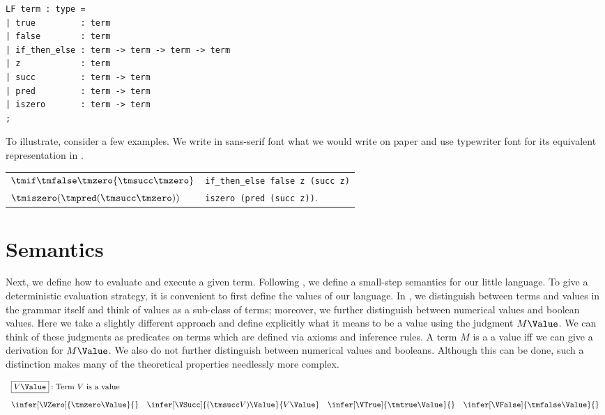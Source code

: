 \begin{lstlisting}
LF term : type =
| true         : term
| false        : term
| if_then_else : term -> term -> term -> term
| z            : term
| succ         : term -> term
| pred         : term -> term
| iszero       : term -> term
;
\end{lstlisting}

To illustrate, consider a few examples. We write in sans-serif font what
we would write on paper and use typewriter font for its equivalent
representation in \beluga.

\begin{center}
\begin{tabular}{l@{\quad is represented as \quad}l}
$\tmif \tmfalse \tmzero {\tmsucc \tmzero}$ &
\lstinline!if_then_else false z (succ z)!\\
$\tmiszero (\tmpred (\tmsucc \tmzero))$ & \lstinline!iszero (pred (succ z))!.
\end{tabular}
\end{center}


\section{Semantics}
Next, we define how to evaluate and execute a given term. Following
\cite{TAPL}, we define  a small-step semantics  for our  little language. To give  a  deterministic evaluation
strategy,  it is convenient to first define the values of our language.  In
\cite{TAPL}, we distinguish between terms and values in the grammar itself and
think of values  as a sub-class of terms; moreover, we further
distinguish between numerical values and boolean values. Here we take  a slightly different
approach and define explicitly  what it means  to be a value using the judgment
$M \Value$.  We can think of these judgments  as predicates on
terms which are defined  via  axioms and inference rules.  A term $M$ is a
a value iff we can give a derivation for $M \Value$. We also do not further
distinguish between numerical values and  booleans. Although this can
be done, such a distinction makes many of the theoretical properties
needlessly more complex.

\[
\begin{array}{c}
\multicolumn{1}{l}{\fbox{$V \Value$}: \mbox{Term $V$ is a value}}\\[1em]
\infer[\VZero]{\tmzero \Value}{} \quad
\infer[\VSucc]{(\tmsucc V) \Value}{V \Value} \quad
\infer[\VTrue]{\tmtrue \Value}{} \quad
\infer[\VFalse]{\tmfalse \Value}{}
\end{array}
\]

